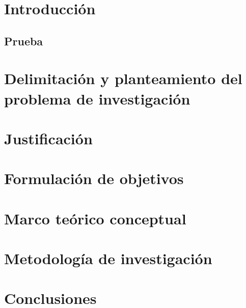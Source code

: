 \documentclass[12pt]{article}
\begin{document}

\tableofcontents
\setcounter{tocdepth}{4}





\newpage

\section{Introducción}
\subsection{Prueba}





\section{Delimitación y planteamiento del problema de investigación}







\section{Justificación}







\newpage
\section{Formulación de objetivos}








\section{Marco teórico conceptual}




\newpage
\section{Metodología de investigación}




\section{Conclusiones}
\end{document}
